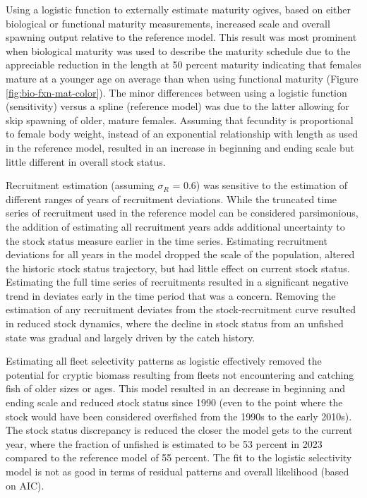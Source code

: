 \documentclass[11pt,
  english,
  letterpaper,
]{article}
\begin{document}
Using a logistic function to externally estimate maturity ogives, based on either biological or functional maturity measurements, increased scale and overall spawning output relative to the reference model. This result was most prominent when biological maturity was used to describe the maturity schedule due to the appreciable reduction in the length at 50 percent maturity indicating that females mature at a younger age on average than when using functional maturity (Figure \ref{fig:bio-fxn-mat-color}). The minor differences between using a logistic function (sensitivity) versus a spline (reference model) was due to the latter allowing for skip spawning of older, mature females. Assuming that fecundity is proportional to female body weight, instead of an exponential relationship with length as used in the reference model, resulted in an increase in beginning and ending scale but little different in overall stock status.

Recruitment estimation (assuming \(\sigma_R\) = 0.6) was sensitive to the estimation of different ranges of years of recruitment deviations. While the truncated time series of recruitment used in the reference model can be considered parsimonious, the addition of estimating all recruitment years adds additional uncertainty to the stock status measure earlier in the time series. Estimating recruitment deviations for all years in the model dropped the scale of the population, altered the historic stock status trajectory, but had little effect on current stock status. Estimating the full time series of recruitments resulted in a significant negative trend in deviates early in the time period that was a concern. Removing the estimation of any recruitment deviates from the stock-recruitment curve resulted in reduced stock dynamics, where the decline in stock status from an unfished state was gradual and largely driven by the catch history.

Estimating all fleet selectivity patterns as logistic effectively removed the potential for cryptic biomass resulting from fleets not encountering and catching fish of older sizes or ages. This model resulted in an decrease in beginning and ending scale and reduced stock status since 1990 (even to the point where the stock would have been considered overfished from the 1990s to the early 2010s). The stock status discrepancy is reduced the closer the model gets to the current year, where the fraction of unfished is estimated to be 53 percent in 2023 compared to the reference model of 55 percent. The fit to the logistic selectivity model is not as good in terms of residual patterns and overall likelihood (based on AIC).
\end{document}
